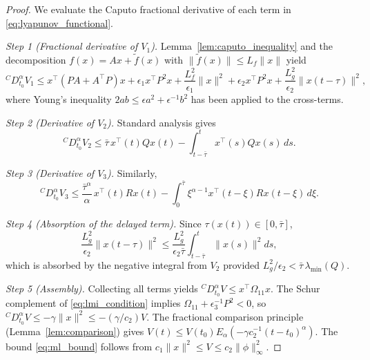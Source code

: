 \documentclass[12pt,a4paper]{article}
\begin{document}
\begin{proof}
We evaluate the Caputo fractional derivative of each term in \eqref{eq:lyapunov_functional}.

\textit{Step 1 (Fractional derivative of $V_1$).} Lemma~\ref{lem:caputo_inequality} and the decomposition $f(x) = Ax + \tilde{f}(x)$ with $\|\tilde{f}(x)\| \leq L_f\|x\|$ yield
\begin{equation}
{}^{C}\!D^{\alpha}_{t_0} V_1 \leq x^{\!\top}(PA + A^{\!\top}\! P)x + \epsilon_1 x^{\!\top} P^2 x + \frac{L_f^2}{\epsilon_1}\|x\|^2 + \epsilon_2 x^{\!\top} P^2 x + \frac{L_g^2}{\epsilon_2}\|x(t-\tau)\|^2,
\end{equation}
where Young's inequality $2a b \leq \epsilon a^2 + \epsilon^{-1}b^2$ has been applied to the cross-terms.

\textit{Step 2 (Derivative of $V_2$).} Standard analysis gives
\begin{equation}
{}^{C}\!D^{\alpha}_{t_0} V_2 \leq \bar{\tau}\, x^{\!\top}(t) Q x(t) - \int_{t-\bar{\tau}}^{t} x^{\!\top}(s) Q x(s) \, ds.
\end{equation}

\textit{Step 3 (Derivative of $V_3$).} Similarly,
\begin{equation}
{}^{C}\!D^{\alpha}_{t_0} V_3 \leq \frac{\bar{\tau}^{\alpha}}{\alpha}\, x^{\!\top}(t) R x(t) - \int_{0}^{\bar{\tau}} \xi^{\alpha-1} x^{\!\top}(t-\xi) R x(t-\xi) \, d\xi.
\end{equation}

\textit{Step 4 (Absorption of the delayed term).} Since $\tau(x(t)) \in [0, \bar{\tau}]$,
\begin{equation}
\frac{L_g^2}{\epsilon_2}\|x(t-\tau)\|^2 \leq \frac{L_g^2}{\epsilon_2 \bar{\tau}} \int_{t-\bar{\tau}}^{t} \|x(s)\|^2 ds,
\end{equation}
which is absorbed by the negative integral from $V_2$ provided $L_g^2/\epsilon_2 < \bar{\tau}\,\lambda_{\min}(Q)$.

\textit{Step 5 (Assembly).} Collecting all terms yields ${}^{C}\!D^{\alpha}_{t_0} V \leq x^{\!\top}\Omega_{11} x$. The Schur complement of \eqref{eq:lmi_condition} implies $\Omega_{11} + \epsilon_3^{-1}P^2 < 0$, so ${}^{C}\!D^{\alpha}_{t_0} V \leq -\gamma \|x\|^2 \leq -(\gamma/c_2) V$. The fractional comparison principle (Lemma~\ref{lem:comparison}) gives $V(t) \leq V(t_0) E_{\alpha}(-\gamma c_2^{-1}(t-t_0)^{\alpha})$. The bound \eqref{eq:ml_bound} follows from $c_1\|x\|^2 \leq V \leq c_2\|\phi\|_{\infty}^2$.
\end{proof}
\end{document}
